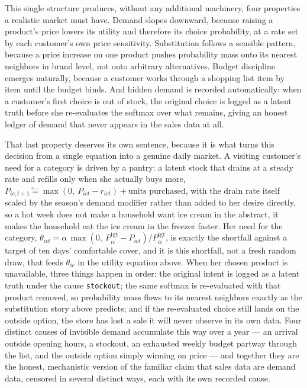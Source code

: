 \documentclass[12pt,a4paper]{article}
\begin{document}
This single structure produces, without any additional machinery, four
properties a realistic market must have. Demand slopes downward, because
raising a product's price lowers its utility and therefore its choice
probability, at a rate set by each customer's own price sensitivity.
Substitution follows a sensible pattern, because a price increase on one
product pushes probability mass onto its nearest neighbors in brand
level, not onto arbitrary alternatives. Budget discipline emerges
naturally, because a customer works through a shopping list item by item
until the budget binds. And hidden demand is recorded automatically:
when a customer's first choice is out of stock, the original choice is
logged as a latent truth before she re-evaluates the softmax over what
remains, giving an honest ledger of demand that never appears in the
sales data at all.

That last property deserves its own sentence, because it is what turns
this decision from a single equation into a genuine daily market. A
visiting customer's need for a category is driven by a pantry: a latent
stock that drains at a steady rate and refills only when she actually
buys more, $P_{ic,t+1} \overset{\leftarrow}{=} \max(0,\ P_{ict} -
r_{ict}) + \text{units purchased}$, with the drain rate itself scaled by
the season's demand modifier rather than added to her desire directly,
so a hot week does not make a household want ice cream in the abstract,
it makes the household eat the ice cream in the freezer faster. Her need
for the category, $\theta_{ict} = \alpha\,\max(0,\ P^{\text{tgt}}_{ic} -
P_{ict})/P^{\text{tgt}}_{ic}$, is exactly the shortfall against a target
of ten days' comfortable cover, and it is this shortfall, not a fresh
random draw, that feeds $\theta_{ic}$ in the utility equation above. When
her chosen product is unavailable, three things happen in order: the
original intent is logged as a latent truth under the cause
\texttt{stockout}; the same softmax is re-evaluated with that product
removed, so probability mass flows to its nearest neighbors exactly as
the substitution story above predicts; and if the re-evaluated choice
still lands on the outside option, the store has lost a sale it will
never observe in its own data. Four distinct causes of invisible demand
accumulate this way over a year --- an arrival outside opening hours, a
stockout, an exhausted weekly budget partway through the list, and the
outside option simply winning on price --- and together they are the
honest, mechanistic version of the familiar claim that sales data are
demand data, censored in several distinct ways, each with its own
recorded cause.
\end{document}
